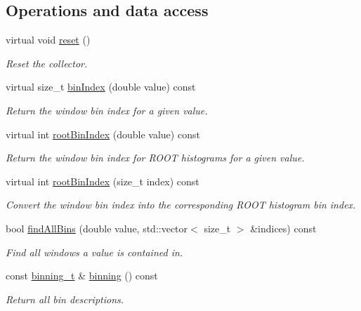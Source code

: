 \subsection*{Operations and data access}
\begin{DoxyCompactItemize}
\item 
virtual void \hyperlink{classSlidingWindow_1_1Window_aab38992dcb5d21c9b42d0dfc2d5d6b70}{reset} ()
\begin{DoxyCompactList}\small\item\em Reset the collector. \end{DoxyCompactList}\item 
virtual size\+\_\+t \hyperlink{classSlidingWindow_1_1Window_a4ce7cbe7a8bc9c3a3e8b5d5ac74300ba}{bin\+Index} (double value) const 
\begin{DoxyCompactList}\small\item\em Return the window bin index for a given value. \end{DoxyCompactList}\item 
virtual int \hyperlink{classSlidingWindow_1_1Window_a07c2d3226451be44b674498f0d47fbaa}{root\+Bin\+Index} (double value) const 
\begin{DoxyCompactList}\small\item\em Return the window bin index for R\+O\+OT histograms for a given value. \end{DoxyCompactList}\item 
virtual int \hyperlink{classSlidingWindow_1_1Window_a019814f4ba2c35edc996e2b2133ec9ce}{root\+Bin\+Index} (size\+\_\+t index) const 
\begin{DoxyCompactList}\small\item\em Convert the window bin index into the corresponding R\+O\+OT histogram bin index. \end{DoxyCompactList}\item 
bool \hyperlink{classSlidingWindow_1_1Window_a13ae48dc79b651da691ddf04e012b7ec}{find\+All\+Bins} (double value, std\+::vector$<$ size\+\_\+t $>$ \&indices) const 
\begin{DoxyCompactList}\small\item\em Find all windows a value is contained in. \end{DoxyCompactList}\item 
const \hyperlink{classSlidingWindow_1_1Window_a71c711c04a16a1f32a9731f80e73b5e8}{binning\+\_\+t} \& \hyperlink{classSlidingWindow_1_1Window_a4f5edd9ab13664503267c782a35d69a0}{binning} () const 
\begin{DoxyCompactList}\small\item\em Return all bin descriptions. \end{DoxyCompactList}\item 

\end{DoxyCompactItemize}
